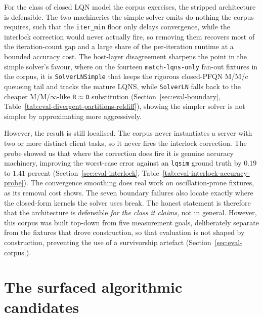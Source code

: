 For the class of closed LQN model the corpus exercises, the stripped architecture is defensible. The two machineries the simple solver omits do nothing the corpus requires, such that the \texttt{iter\_min} floor only delays convergence, while the interlock correction would never actually fire, so removing them recovers most of the iteration-count gap and a large share of the per-iteration runtime at a bounded accuracy cost. The host-layer disagreement sharpens the point in the simple solver's favour, where on the fourteen \texttt{match-lqns-only} fan-out fixtures in the corpus, it is \texttt{SolverLNSimple} that keeps the rigorous closed-PFQN M/M/c queueing tail and tracks the mature LQNS, while \texttt{SolverLN} falls back to the cheaper M/M/$\infty$-like \texttt{R$\approx$D} substitution (Section~\ref{sec:eval-boundary}, Table~\ref{tab:eval-divergent-partitions-reldiff}), showing the simpler solver is not simpler by approximating more aggressively.

However, the result is still localised. The corpus never instantiates a server with two or more distinct client tasks, so it never fires the interlock correction. The probe showed us that where the correction does fire it is genuine accuracy machinery, improving the worst-case error against an \texttt{lqsim} ground truth by $0.19$ to $1.41$ percent (Section~\ref{sec:eval-interlock}, Table~\ref{tab:eval-interlock-accuracy-probe}). The convergence smoothing does real work on oscillation-prone fixtures, as its removal cost shows. The seven boundary failures also locate exactly where the closed-form kernels the solver uses break. The honest statement is therefore that the architecture is defensible \emph{for the class it claims}, not in general. However, this corpus was built top-down from five measurement goals, deliberately separate from the fixtures that drove construction, so that evaluation is not shaped by construction, preventing the use of a survivorship artefact (Section~\ref{sec:eval-corpus}).



\section{The surfaced algorithmic candidates}
\label{sec:concl-candidate}

